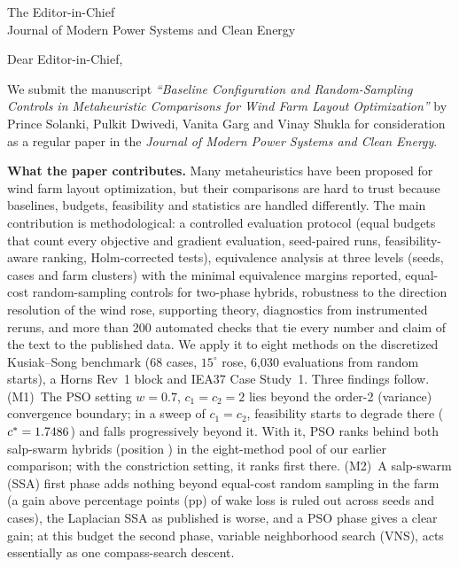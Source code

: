 \documentclass[11pt]{letter}
\date{\TBD{date of submission}}
\newcommand{\Journal}{Journal of Modern Power Systems and Clean Energy}
\newcommand{\JournalEditor}{The Editor-in-Chief}
\begin{document}
\pagestyle{empty}
\begin{letter}{\JournalEditor\\\Journal}
\vspace{-3.2em}
\opening{Dear Editor-in-Chief,}

We submit the manuscript \textit{``Baseline Configuration and Random-Sampling Controls in Metaheuristic Comparisons for Wind Farm Layout Optimization''} by Prince Solanki, Pulkit Dwivedi, Vanita Garg and Vinay Shukla for consideration as a regular paper in the \textit{\Journal}.

\textbf{What the paper contributes.} Many metaheuristics have been proposed for wind farm layout optimization, but their comparisons are hard to trust because baselines, budgets, feasibility and statistics are handled differently. The main contribution is methodological: a controlled evaluation protocol (equal budgets that count every objective and gradient evaluation, seed-paired runs, feasibility-aware ranking, Holm-corrected tests), equivalence analysis at three levels (seeds, cases and farm clusters) with the minimal equivalence margins reported, equal-cost random-sampling controls for two-phase hybrids, robustness to the direction resolution of the wind rose, supporting theory, diagnostics from instrumented reruns, and more than 200 automated checks that tie every number and claim of the text to the published data. We apply it to eight methods on the discretized Kusiak--Song benchmark (68 cases, $15^\circ$ rose, 6,030 evaluations from random starts), a Horns Rev~1 block and IEA37 Case Study~1. Three findings follow.
(M1)~The PSO setting $w=0.7$, $c_1=c_2=2$ lies beyond the order-2 (variance) convergence boundary; in a sweep of $c_1=c_2$, feasibility starts to degrade there ($c^\ast=1.7486$) and falls progressively beyond it. With it, PSO ranks behind both salp-swarm hybrids (position \NBaseOldPSOPos) in the eight-method pool of our earlier comparison; with the constriction setting, it ranks first there.
(M2)~A salp-swarm (SSA) first phase adds nothing beyond equal-cost random sampling in the farm (a gain above \NEqMargin{} percentage points (pp) of wake loss is ruled out across seeds and cases), the Laplacian SSA as published is worse, and a PSO phase gives a clear gain; at this budget the second phase, variable neighborhood search (VNS), acts essentially as one compass-search descent.

\end{letter}
\end{document}
